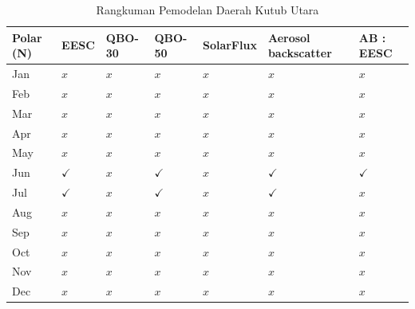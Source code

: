 \begin{enumerate}
\begin{table}[p]
    \centering
\begin{tabular}{|l|l|l|l|l|l|l|}
\hline Polar (N) & EESC & QBO-30 & QBO-50 & SolarFlux & Aerosol backscatter & AB : EESC \\
\hline Jan & $x$ & $x$ & $x$ & $x$ & $x$ & $x$ \\
\hline Feb & $x$ & $x$ & $x$ & $x$ & $x$ & $x$ \\
\hline Mar & $x$ & $x$ & $x$ & $x$ & $x$ & $x$ \\
\hline Apr & $x$ & $x$ & $x$ & $x$ & $x$ & $x$ \\
\hline May & $x$ & $x$ & $x$ & $x$ & $x$ & $x$ \\
\hline Jun & $\checkmark$ & $x$ & $\checkmark$ & $x$ & $\checkmark$ & $\checkmark$ \\
\hline Jul & $\checkmark$ & $x$ & $\checkmark$ & $x$ & $\checkmark$ & $x$ \\
\hline Aug & $x$ & $x$ & $x$ & $x$ & $x$ & $x$ \\
\hline Sep & $x$ & $x$ & $x$ & $x$ & $x$ & $x$ \\
\hline Oct & $x$ & $x$ & $x$ & $x$ & $x$ & $x$ \\
\hline Nov & $x$ & $x$ & $x$ & $x$ & $x$ & $x$ \\
\hline Dec & $x$ & $x$ & $x$ & $x$ & $x$ & $x$ \\
\hline
\end{tabular}

    \caption{Rangkuman Pemodelan Daerah Kutub Utara}
    \label{tab:NP}
\end{table}

\begin{table}[p]
    \centering



\end{table}
\end{enumerate}
